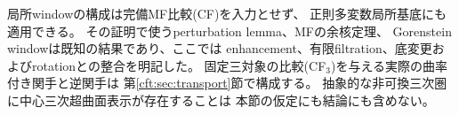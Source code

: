 \begin{remark}[比較原理の適用範囲]\label{tw:rem:scope}
局所windowの構成は完備MF比較(CF)を入力とせず、
正則多変数局所基底にも適用できる。
その証明で使うperturbation lemma、MFの余核定理、
Gorenstein windowは既知の結果であり、ここでは
enhancement、有限filtration、底変更およびrotationとの整合を明記した。
固定三対象の比較(CF$_3$)を与える実際の曲率付き関手と逆関手は
第\ref{cft:sec:transport}節で構成する。
抽象的な非可換三次圏に中心三次超曲面表示が存在することは
本節の仮定にも結論にも含めない。
\end{remark}
